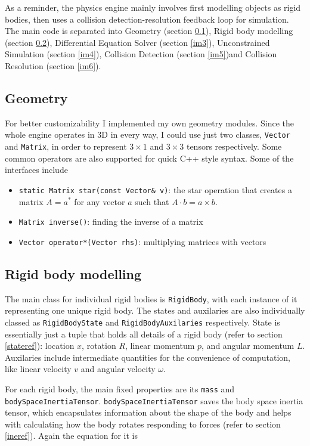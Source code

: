 \documentclass[12pt,a4paper,twoside,openright]{report}
\newcommand{\code}{\texttt}
\begin{document}
As a reminder, the physics engine mainly involves first modelling objects as rigid bodies, then uses a collision detection-resolution feedback loop for simulation. The main code is separated into Geometry (section \ref{im1}), Rigid body modelling (section \ref{im2}), Differential Equation Solver (section \ref{im3}), Unconstrained Simulation (section \ref{im4}), Collision Detection (section \ref{im5})and Collision Resolution (section \ref{im6}).

\subsection{Geometry}\label{im1}

For better customizability I implemented my own geometry modules. Since the whole engine operates in 3D in every way, I could use just two classes, \code{Vector} and \code{Matrix}, in order to represent $3 \times 1$ and $3 \times 3$ tensors respectively. Some common operators are also supported for quick C++ style syntax. Some of the interfaces include

\begin{itemize}
\item \code{static Matrix star(const Vector\& v)}: the star operation that creates a matrix $A=a^*$ for any vector $a$ such that $A \cdot b = a\times b$.
\item \code{Matrix inverse()}: finding the inverse of a matrix
\item \code{Vector operator*(Vector rhs)}: multiplying matrices with vectors
\end{itemize}

\subsection{Rigid body modelling}\label{im2}

The main class for individual rigid bodies is \code{RigidBody}, with each instance of it representing one unique rigid body. The states and auxilaries are also individually classed as \code{RigidBodyState} and \code{RigidBodyAuxilaries} respectively. State is essentially just a tuple that holds all details of a rigid body (refer to section \ref{stateref}): location $x$, rotation $R$, linear momentum $p$, and angular momentum $L$. Auxilaries include intermediate quantities for the convenience of computation, like linear velocity $v$ and angular velocity $\omega$. 

For each rigid body, the main fixed properties are its \code{mass} and \code{bodySpaceInertiaTensor}. \code{bodySpaceInertiaTensor} saves the body space inertia tensor, which encapsulates information about the shape of the body and helps with calculating how the body rotates responding to forces (refer to section \ref{ineref}). Again the equation for it is
\end{document}

